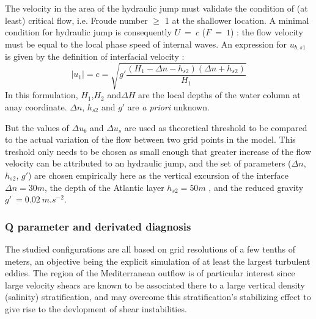 The velocity in the area of the hydraulic jump must validate the condition of (at least) critical flow, i.e. Froude number $\geq$ 1 at the shallower location. A minimal condition for hydraulic jump is consequently  $U\ =\ c$ ($F\ =\ 1$) : the flow velocity must be equal to the local phase speed of internal waves. An expression for $u_{b,s1}$ is given by the definition of interfacial velocity : 
\begin{equation}
|u_1|=c=\sqrt{g' \frac{(H_1-\Delta n - h_{s2})(\Delta n + h_{s2})}{H_1}}
\end{equation}
In this formulation, $H_1$,$H_2$ and$\Delta H$ are the local depths of the water column at anay coordinate. $\Delta n$, $h_{s2}$ and $g'$ are \textit{a priori} unknown.

But the values of $\Delta u_b$ and $\Delta u_s$ are used as theoretical threshold to be compared to the actual variation of the flow between two grid points in the model. This treshold only needs to be chosen as small enough that greater increase of the flow velocity can be attributed to an hydraulic jump, and the set of parameters ($\Delta n$, $h_{s2}$, $g'$) are chosen empirically here as the vertical excursion of the interface $\Delta n = 30m$, the depth of the Atlantic layer $h_{s2}=50 m$ , and the reduced gravity $g'\ =0.02\ m.s^{-2}$.

\subsubsection{Q parameter and derivated diagnosis}
\label{sectiondiagQ}

The studied configurations are all based on grid resolutions of a few tenths of meters, an objective being the explicit simulation of at least the largest turbulent eddies. The region of the Mediterranean outflow is of particular interest since large velocity shears are known to be associated there to a large vertical density (salinity) stratification, and may overcome this stratification's stabilizing effect to give rise to the devlopment of shear instabilities. %

